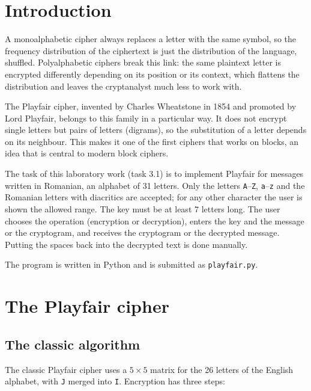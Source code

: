 \documentclass[12pt,a4paper]{article}
\begin{document}
\setcounter{page}{2}
\tableofcontents
\newpage

\section*{Introduction}

A monoalphabetic cipher always replaces a letter with the same symbol, so the frequency distribution of the ciphertext is just the distribution of the language, shuffled. Polyalphabetic ciphers break this link: the same plaintext letter is encrypted differently depending on its position or its context, which flattens the distribution and leaves the cryptanalyst much less to work with.

The Playfair cipher, invented by Charles Wheatstone in 1854 and promoted by Lord Playfair, belongs to this family in a particular way. It does not encrypt single letters but pairs of letters (digrams), so the substitution of a letter depends on its neighbour. This makes it one of the first ciphers that works on blocks, an idea that is central to modern block ciphers.

The task of this laboratory work (task 3.1) is to implement Playfair for messages written in Romanian, an alphabet of 31 letters. Only the letters \texttt{A}--\texttt{Z}, \texttt{a}--\texttt{z} and the Romanian letters with diacritics are accepted; for any other character the user is shown the allowed range. The key must be at least 7 letters long. The user chooses the operation (encryption or decryption), enters the key and the message or the cryptogram, and receives the cryptogram or the decrypted message. Putting the spaces back into the decrypted text is done manually.

The program is written in Python and is submitted as \texttt{playfair.py}.

\newpage
\section{The Playfair cipher}

\subsection{The classic algorithm}

The classic Playfair cipher uses a $5 \times 5$ matrix for the 26 letters of the English alphabet, with \texttt{J} merged into \texttt{I}. Encryption has three steps:
\end{document}

